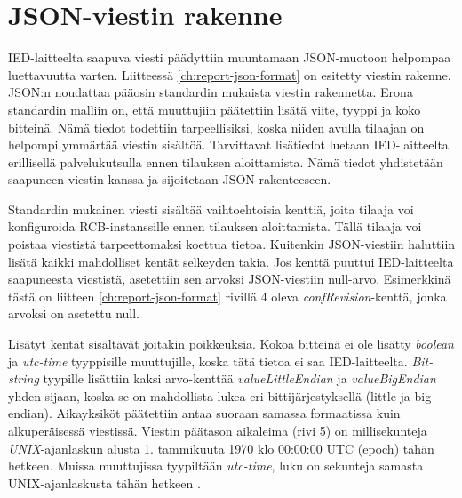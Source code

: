 \section{JSON-viestin rakenne}
IED-laitteelta saapuva viesti päädyttiin muuntamaan JSON-muotoon helpompaa luettavuutta varten. Liitteessä \ref{ch:report-json-format} on esitetty viestin rakenne. JSON:n noudattaa pääosin standardin mukaista viestin rakennetta. Erona standardin malliin on, että muuttujiin päätettiin lisätä viite, tyyppi ja koko bitteinä. Nämä tiedot todettiin tarpeellisiksi, koska niiden avulla tilaajan on helpompi ymmärtää viestin sisältöä. Tarvittavat lisätiedot luetaan IED-laitteelta erillisellä palvelukutsulla ennen tilauksen aloittamista. Nämä tiedot yhdistetään saapuneen viestin kanssa ja sijoitetaan JSON-rakenteeseen.

Standardin mukainen viesti sisältää vaihtoehtoisia kenttiä, joita tilaaja voi konfiguroida RCB-instanssille ennen tilauksen aloittamista. Tällä tilaaja voi poistaa viestistä tarpeettomaksi koettua tietoa. Kuitenkin JSON-viestiin haluttiin lisätä kaikki mahdolliset kentät selkeyden takia. Jos kenttä puuttui IED-laitteelta saapuneesta viestistä, asetettiin sen arvoksi JSON-viestiin null-arvo. Esimerkkinä tästä on liitteen \ref{ch:report-json-format} rivillä 4 oleva \emph{confRevision}-kenttä, jonka arvoksi on asetettu null.

Lisätyt kentät sisältävät joitakin poikkeuksia. Kokoa bitteinä ei ole lisätty \emph{boolean} ja \emph{utc-time} tyyppisille muuttujille, koska tätä tietoa ei saa IED-laitteelta. \emph{Bit-string} tyypille lisättiin kaksi arvo-kenttää \emph{valueLittleEndian} ja \emph{valueBigEndian} yhden sijaan, koska se on mahdollista lukea eri bittijärjestyksellä (little ja big endian). Aikayksiköt päätettiin antaa suoraan samassa formaatissa kuin alkuperäisessä viestissä. Viestin päätason aikaleima (rivi 5) on millisekunteja \emph{UNIX}-ajanlaskun alusta 1. tammikuuta 1970 klo 00:00:00 UTC (epoch) tähän hetkeen. Muissa muuttujissa tyypiltään \emph{utc-time}, luku on sekunteja samasta UNIX-ajanlaskusta tähän hetkeen \mbox{\cite[s.~26--27]{IEC61850-7-2}}.